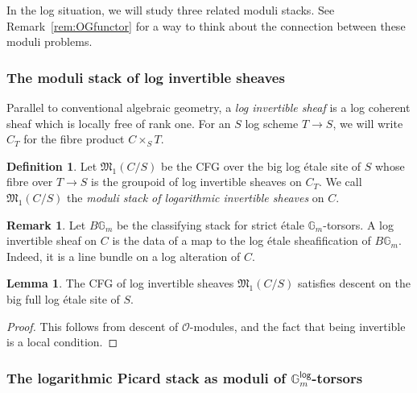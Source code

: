 \documentclass[11pt]{amsart}
\theoremstyle{definition}
\theoremstyle{definition}
\newtheorem{lemma}[theorem]{Lemma}
\newtheorem{remark}[theorem]{Remark}
\newtheorem{definition}[theorem]{Definition}
\newcommand{\cO}{\mathcal{O}}
\newcommand{\cal}{\mathcal}
\def\cO{{\cal O}}
\begin{document}
    In the log situation, we will study three related moduli stacks. See Remark~\ref{rem:OGfunctor} for a way to think about the connection between these moduli problems. 

\subsubsection{The moduli stack of log invertible sheaves} Parallel to conventional algebraic geometry, a \emph{log invertible sheaf} is a log coherent sheaf which is locally free of rank one. 
For an $S$ log scheme $T\rightarrow S$, we will write $C_T$ for the fibre product $C\times_S T$.
\begin{definition}
    Let $\mathfrak{M}_1(C/S)$ be the CFG over the big log \'etale site of $S$ whose fibre over $T\rightarrow S$ is the groupoid of log invertible sheaves on $C_T$. We call $\mathfrak{M}_1(C/S)$ the \emph{moduli stack of logarithmic invertible sheaves} on $C$.
\end{definition}

\begin{remark}
    Let $B\mathbb{G}_m$ be the classifying stack for strict \'etale $\mathbb{G}_m$-torsors. A log invertible sheaf on $C$ is the data of a map to the log \'etale sheafification of $B\mathbb{G}_m$. Indeed, it is a line bundle on a log alteration of $C$.
\end{remark}

\begin{lemma}\label{lem:MSatisfiesDescent}
    The CFG of log invertible sheaves $\mathfrak{M}_1(C/S)$ satisfies descent on the big full log \'etale site of $S$.
\end{lemma}

\begin{proof}
    This follows from descent of $\cO$-modules, and the fact that being invertible is a local condition.
\end{proof}

\subsubsection{The logarithmic Picard stack as moduli of $\mathbb{G}_m^\mathsf{log}$-torsors}\label{sec:defnGlog} 
\end{document}
